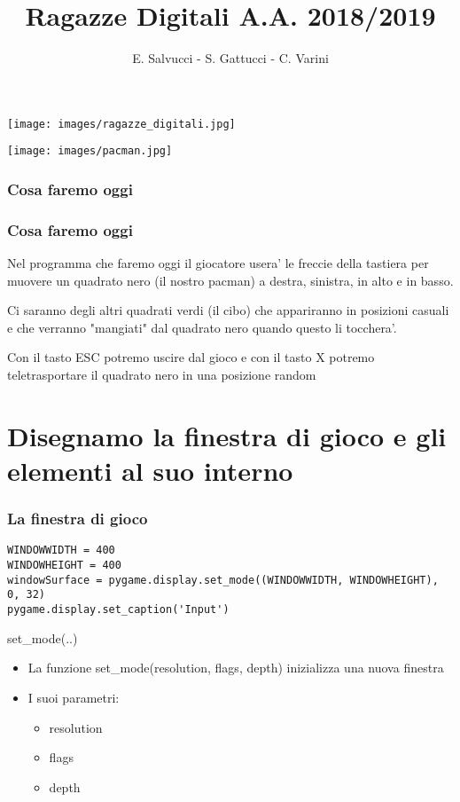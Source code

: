 \documentclass{beamer}
\title[Ragazze Digitali 2019]{Ragazze Digitali A.A. 2018/2019}
\author{E. Salvucci - S. Gattucci - C. Varini}
\date{}
\begin{document}
{\texttt{[image: images/ragazze\_digitali.jpg]}}
\begin{frame}
\end{frame}

{\texttt{[image: images/pacman.jpg]}}
\begin{frame}
\frametitle{Cosa faremo oggi}

\end{frame}


\begin{frame}
\frametitle{Cosa faremo oggi}
Nel programma che faremo oggi il giocatore usera' le freccie della tastiera per muovere un quadrato nero (il nostro pacman) a destra, sinistra, in alto e in basso.

Ci saranno degli altri quadrati verdi (il cibo) che appariranno in posizioni casuali e che verranno "mangiati" dal quadrato nero quando questo li tocchera'.

Con il tasto ESC potremo uscire dal gioco e con il tasto X potremo teletrasportare il quadrato nero in una posizione random
\end{frame}

\section{Disegnamo la finestra di gioco e gli elementi al suo interno}

\begin{frame}[fragile]
    \frametitle{La finestra di gioco}
    
    \begin{lstlisting}
WINDOWWIDTH = 400
WINDOWHEIGHT = 400
windowSurface = pygame.display.set_mode((WINDOWWIDTH, WINDOWHEIGHT), 0, 32)
pygame.display.set_caption('Input')
    \end{lstlisting}
    
    \begin{block}{set\_mode(..)}
        \begin{itemize}
            \item La funzione set\_mode(resolution, flags, depth) inizializza una nuova finestra
            \item I suoi parametri:
                \begin{itemize}
                    \item resolution
                    \item flags
                    \item depth
                \end{itemize}
        \end{itemize}
    \end{block}

\end{frame}
\end{document}
